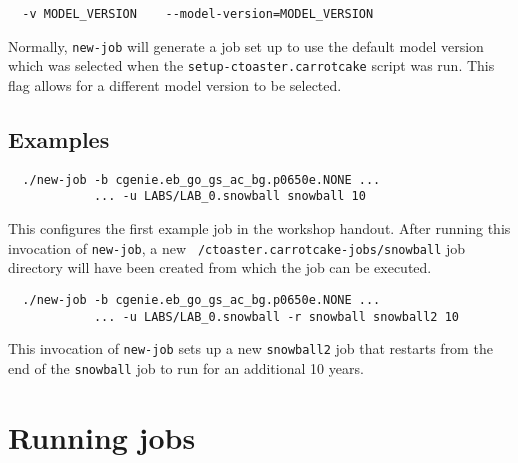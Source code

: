 \documentclass[a4paper,10pt,article]{memoir}
\begin{document}
\begin{verbatim}
  -v MODEL_VERSION    --model-version=MODEL_VERSION
\end{verbatim}
Normally, \texttt{new-job} will generate a job set up to use the
default model version which was selected when the
\texttt{setup-ctoaster.carrotcake} script was run.  This flag allows for a
different model version to be selected.

\subsection*{Examples}

\begin{verbatim}
  ./new-job -b cgenie.eb_go_gs_ac_bg.p0650e.NONE ...
            ... -u LABS/LAB_0.snowball snowball 10
\end{verbatim}
This configures the first example job in the workshop handout.  After
running this invocation of \texttt{new-job}, a new
\texttt{~/ctoaster.carrotcake-jobs/snowball} job directory will have been created
from which the job can be executed.

\begin{verbatim}
  ./new-job -b cgenie.eb_go_gs_ac_bg.p0650e.NONE ...
            ... -u LABS/LAB_0.snowball -r snowball snowball2 10
\end{verbatim}
This invocation of \texttt{new-job} sets up a new \texttt{snowball2}
job that restarts from the end of the \texttt{snowball} job to run for
an additional 10 years.

\section{Running jobs}
\end{document}
